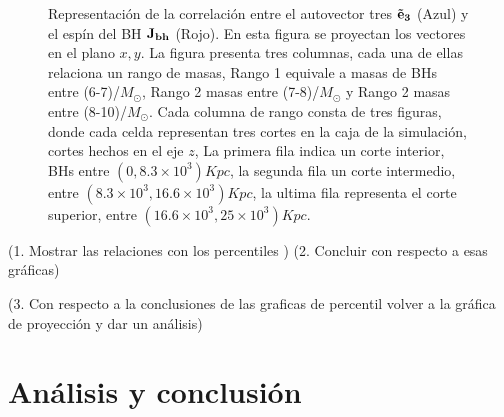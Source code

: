 \begin{figure}
\caption{Representación de la correlación entre el autovector tres ${\bf{\vec{e}}_{3}}$ (Azul) y el espín del BH ${\bf{J_{bh}}}$ (Rojo). En esta figura se proyectan los vectores en el plano $x,y$. La figura presenta tres columnas, cada una de ellas relaciona un rango de masas, Rango 1 equivale a masas de BHs entre (6-7)/$M_{\odot}$, Rango 2 masas entre (7-8)/$M_{\odot}$ y Rango 2 masas entre (8-10)/$M_{\odot}$. Cada columna de rango consta de tres figuras, donde cada celda  representan tres cortes en la caja de la simulación, cortes hechos en el eje $z$, La primera fila indica un corte interior, BHs entre $(0, 8.3\times10^{3}) Kpc$,  la segunda fila un corte intermedio, entre $(8.3\times10^{3}, 16.6\times10^{3}) Kpc$, la ultima fila representa el corte superior, entre  $ (16.6\times10^{3}, 25\times10^{3}) Kpc$. } 
\label{fig: proyeccion espines} 
\end{figure}

(1. Mostrar las relaciones con los percentiles )
(2. Concluir con respecto a esas gráficas)

(3. Con respecto a la conclusiones de las graficas de percentil volver a la gráfica de proyección y dar un análisis)


\section{ Análisis y conclusión}
\label{sec: Analisis y conclusion}







